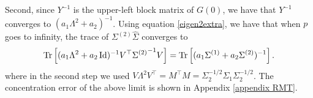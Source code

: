 Second, since $Y^{-1}$ is the upper-left block matrix of $G(0)$, we have that $Y^{-1}$ converges to $(a_1\Lambda^2 + a_2)^{-1}$.
Using equation \eqref{eigen2extra}, we have that when $p$ goes to infinity, the trace of $\Sigma^{(2)} \hat{\Sigma}$ converges to \[ \operatorname{Tr}\left[(a_1 \Lambda^2 + a_2\operatorname{Id})^{-1} V^{\top} {\Sigma^{(2)}}^{-1} V\right] = \operatorname{Tr}\left[(a_1 \Sigma^{(1)} + a_2 \Sigma^{(2)})^{-1}\right]. \]
where in the second step we used $V \Lambda^2 V^\top=M^\top M=\Sigma_2^{-1/2}\Sigma_1\Sigma_2^{-1/2}$.
The concentration error of the above limit is shown in Appendix \ref{appendix RMT}.%

